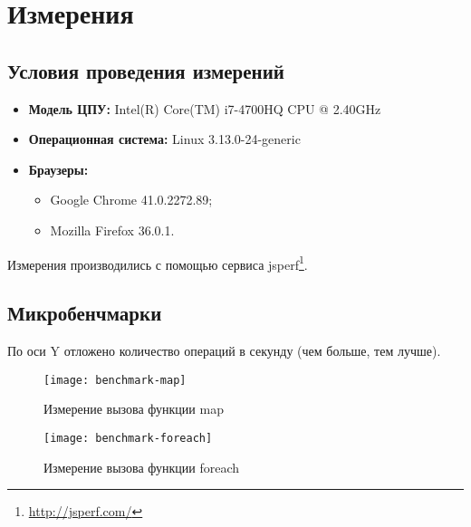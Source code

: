 \section{Измерения}

\subsection{Условия проведения измерений}

\begin{itemize}
    \item \textbf{Модель ЦПУ:} Intel(R) Core(TM) i7-4700HQ CPU @ 2.40GHz
    \item \textbf{Операционная система:} Linux 3.13.0-24-generic
    \item \textbf{Браузеры:}
      \begin{itemize}
        \item Google Chrome 41.0.2272.89;
        \item Mozilla Firefox 36.0.1.
      \end{itemize}
\end{itemize}

Измерения производились с помощью сервиса jsperf\footnote{\url{http://jsperf.com/}}.

\subsection{Микробенчмарки}

По оси Y отложено количество операций в секунду (чем больше, тем лучше).

\begin{figure}[H]
  \begin{center}
    \texttt{[image: benchmark-map]}
  \end{center}
  \caption{Измерение вызова функции map}
\end{figure}

\begin{figure}[H]
  \begin{center}
    \texttt{[image: benchmark-foreach]}
  \end{center}
  \caption{Измерение вызова функции foreach}
\end{figure}
